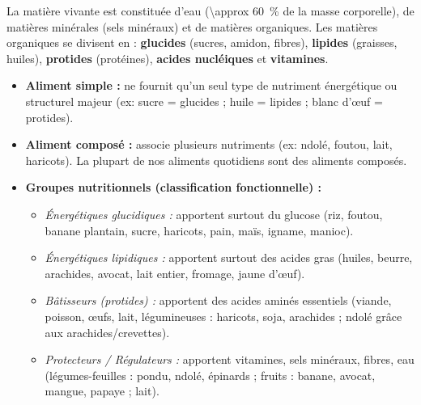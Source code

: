 \documentclass[11pt]{article}
\begin{document}
\begin{definition}
La matière vivante est constituée d'eau (\SI{\approx 60}{\%} de la masse corporelle), de matières minérales (sels minéraux) et de matières organiques. Les matières organiques se divisent en : \textbf{glucides} (sucres, amidon, fibres), \textbf{lipides} (graisses, huiles), \textbf{protides} (protéines), \textbf{acides nucléiques} et \textbf{vitamines}.
\begin{itemize}
\item \textbf{Aliment simple :} ne fournit qu'un seul type de nutriment énergétique ou structurel majeur (ex: sucre = glucides ; huile = lipides ; blanc d'œuf = protides).
\item \textbf{Aliment composé :} associe plusieurs nutriments (ex: ndolé, foutou, lait, haricots). La plupart de nos aliments quotidiens sont des aliments composés.
\item \textbf{Groupes nutritionnels (classification fonctionnelle) :}
\begin{itemize}
\item \textit{Énergétiques glucidiques :} apportent surtout du glucose (riz, foutou, banane plantain, sucre, haricots, pain, maïs, igname, manioc).
\item \textit{Énergétiques lipidiques :} apportent surtout des acides gras (huiles, beurre, arachides, avocat, lait entier, fromage, jaune d'œuf).
\item \textit{Bâtisseurs (protides) :} apportent des acides aminés essentiels (viande, poisson, œufs, lait, légumineuses : haricots, soja, arachides ; ndolé grâce aux arachides/crevettes).
\item \textit{Protecteurs / Régulateurs :} apportent vitamines, sels minéraux, fibres, eau (légumes-feuilles : pondu, ndolé, épinards ; fruits : banane, avocat, mangue, papaye ; lait).
\end{itemize}
\end{itemize}
\end{definition}
\end{document}
